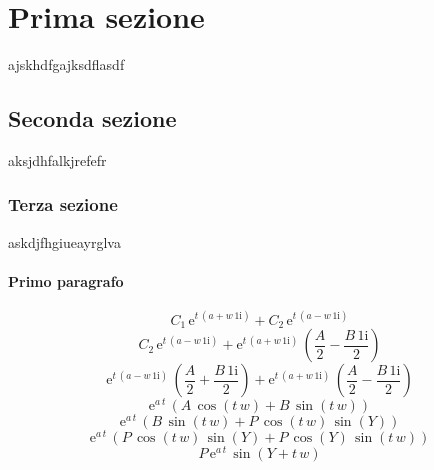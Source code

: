\documentclass{article}
\begin{document}
\section{Prima sezione}
ajskhdfgajksdflasdf
\subsection{Seconda sezione}
aksjdhfalkjrefefr
\subsubsection{Terza sezione}
askdjfhgiueayrglva
\paragraph{Primo paragrafo}
\begin{equation}
C_{1}\,{\mathrm{e}}^{t\,\left(a+w\,1{}\mathrm{i}\right)}+C_{2}\,{\mathrm{e}}^{t\,\left(a-w\,1{}\mathrm{i}\right)}
\end{equation}
\begin{equation}
C_{2}\,{\mathrm{e}}^{t\,\left(a-w\,1{}\mathrm{i}\right)}+{\mathrm{e}}^{t\,\left(a+w\,1{}\mathrm{i}\right)}\,\left(\frac{A}{2}-\frac{B\,1{}\mathrm{i}}{2}\right)
\end{equation}
\begin{equation}
{\mathrm{e}}^{t\,\left(a-w\,1{}\mathrm{i}\right)}\,\left(\frac{A}{2}+\frac{B\,1{}\mathrm{i}}{2}\right)+{\mathrm{e}}^{t\,\left(a+w\,1{}\mathrm{i}\right)}\,\left(\frac{A}{2}-\frac{B\,1{}\mathrm{i}}{2}\right)
\end{equation}
\begin{equation}
{\mathrm{e}}^{a\,t}\,\left(A\,\cos\left(t\,w\right)+B\,\sin\left(t\,w\right)\right)
\end{equation}
\begin{equation}
{\mathrm{e}}^{a\,t}\,\left(B\,\sin\left(t\,w\right)+P\,\cos\left(t\,w\right)\,\sin\left(Y\right)\right)
\end{equation}
\begin{equation}
{\mathrm{e}}^{a\,t}\,\left(P\,\cos\left(t\,w\right)\,\sin\left(Y\right)+P\,\cos\left(Y\right)\,\sin\left(t\,w\right)\right)
\end{equation}
\begin{equation}
P\,{\mathrm{e}}^{a\,t}\,\sin\left(Y+t\,w\right)
\end{equation}
\end{document}
